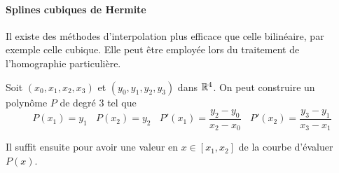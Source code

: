 \paragraph{Splines cubiques de Hermite}

Il existe des méthodes d'interpolation plus efficace que celle bilinéaire, par exemple celle cubique. Elle peut être employée lors du traitement de l'homographie particulière.

Soit $(x_0,x_1,x_2,x_3)$ et $(y_0,y_1,y_2,y_3)$ dans $\mathbb{R}^4$. On peut construire un polynôme $P$ de degré 3 tel que  
\begin{equation*}
P(x_1)=y_1~~~~P(x_2)=y_2~~~~P'(x_1)= \frac{y_2-y_0}{x_2 -x_0}~~~~P'(x_2)= \frac{y_3-y_1}{x_3 -x_1}
\end{equation*}

Il suffit ensuite pour avoir une valeur en $x\in [x_1,x_2]$ de la courbe d'évaluer $P(x)$.
